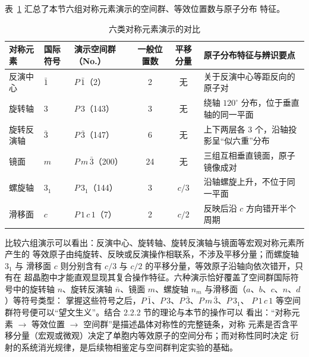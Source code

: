 表~\ref{tab:sym-summary} 汇总了本节六组对称元素演示的空间群、等效位置数与原子分布
特征。

\begin{table}[H]
  \centering
  \small
  \caption{六类对称元素演示的对比}
  \label{tab:sym-summary}
  \begin{tabular}{@{}lllccp{3.6cm}@{}}
    \toprule
    对称元素 & 国际符号 & 演示空间群（No.） & 一般位置数 & 平移分量 & 原子分布特征与辨识要点 \\
    \midrule
    反演中心 & $\bar1$ & $P\,\bar1$（2） & 2 & 无 & 关于反演中心等距反向的原子对 \\
    旋转轴 & $3$ & $P\,3$（143） & 3 & 无 & 绕轴 $120^\circ$ 分布，位于垂直轴的同一平面 \\
    旋转反演轴 & $\bar3$ & $P\,\bar3$（147） & 6 & 无 & 上下两层各 3 个，沿轴投影呈``似六重''分布 \\
    镜面 & $m$ & $P\,m\,\bar3$（200） & 24 & 无 & 三组互相垂直镜面，原子镜像成对 \\
    螺旋轴 & $3_1$ & $P\,3_1$（144） & 3 & $c/3$ & 沿轴螺旋上升，不位于同一平面 \\
    滑移面 & $c$ & $P\,1\,c\,1$（7） & 2 & $c/2$ & 反映后沿 $c$ 方向错开半个周期 \\
    \bottomrule
  \end{tabular}
\end{table}

比较六组演示可以看出：反演中心、旋转轴、旋转反演轴与镜面等宏观对称元素所产生的
等效原子由纯旋转、反映或反演操作相联系，不涉及平移分量；而螺旋轴 $3_1$ 与
滑移面 $c$ 则分别含有 $c/3$ 与 $c/2$ 的平移分量，等效原子沿轴向依次错开，只有在
超晶胞中才能直观显现其复合操作特征。六种演示恰好覆盖了空间群国际符号中的旋转轴 $n$、旋转反演轴
$\bar n$、镜面 $m$、螺旋轴 $n_m$ 与滑移面（$a$、$b$、$c$、$n$、$d$）等符号类型：
掌握这些符号之后，$P\,\bar1$、$P\,3$、$P\,\bar3$、$P\,m\,\bar3$、$P\,3_1$、
$P\,1\,c\,1$ 等空间群符号便可以``望文生义''。结合 2.2.2 节的理论与本节的操作可以
看出：``对称元素 $\to$ 等效位置 $\to$ 空间群''是描述晶体对称性的完整链条，对称
元素是否含平移分量（宏观或微观）决定了单胞内等效原子的空间分布；而对称性同时决定
衍射的系统消光规律，是后续物相鉴定与空间群判定实验的基础。
